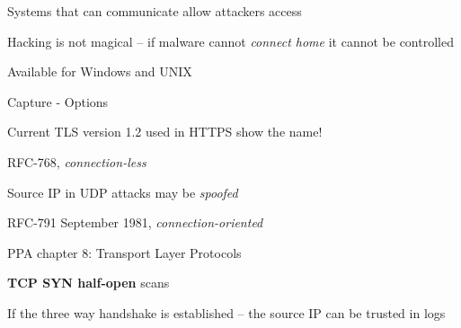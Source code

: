\documentclass[Screen16to9,17pt]{foils}
\begin{document}
Systems that can communicate allow attackers access

Hacking is not magical -- if malware cannot \emph{connect home} it cannot be controlled



\centerline{}
\centerline{Available for Windows and UNIX}



\centerline{Capture - Options}



\centerline{Current TLS version 1.2 used in HTTPS show the name!}


\begin{list1}
\item RFC-768, \emph{connection-less}
\item Source IP in UDP attacks may be \emph{spoofed}
\end{list1}


\begin{list1}
\item RFC-791 September 1981, \emph{connection-oriented}
\end{list1}



\begin{list2}
\item PPA chapter 8: Transport Layer Protocols
\item {\bfseries TCP SYN half-open} scans
\item If the three way handshake is established -- the source IP can be trusted in logs
\end{list2}


\end{document}
